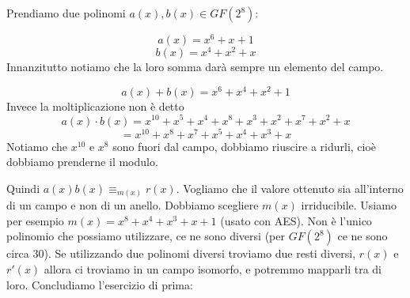 \documentclass[12pt]{report}
\begin{document}
    \begin{exmp}
        Prendiamo due polinomi $a(x),b(x) \in GF(2^8)$:

        $$a(x) = x^6 + x + 1$$
        $$b(x) = x^4 + x^2 + x$$
        Innanzitutto notiamo che la loro somma darà sempre un elemento del campo.

        $$a(x) + b(x) = x^6 + x^4 + x^2 + 1$$
        Invece la moltiplicazione non è detto
        $$a(x) \cdot b(x)  = x^10 + x^5  + x^4 + x^8 + x^3 + x^2 + x^7 + x^2 + x$$
        $$= x^10 + x^8 + x^7 + x^5 + x^4 + x^3 + x$$
        Notiamo che $x^{10}$ e $x^8$ sono fuori dal campo, dobbiamo riuscire a ridurli, cioè dobbiamo prenderne il modulo.

        \begin{center}
        \end{center}

        \noindent
        Quindi $a(x) b(x) \equiv_{m(x)} r(x)$. Vogliamo che il valore ottenuto sia all'interno di un campo e non di un anello.  Dobbiamo scegliere $m(x)$ irriducibile. Usiamo per esempio $m(x) = x^8 + x^4 + x^3 + x + 1$ (usato con AES). Non è l'unico polinomio che possiamo utilizzare, ce ne sono diversi (per $GF(2^8)$ ce ne sono circa 30). Se utilizzando due polinomi diversi troviamo due resti diversi, $r(x)$ e $r'(x)$ allora ci troviamo in un campo isomorfo, e potremmo mapparli tra di loro.
        Concludiamo l'esercizio di prima:

        \begin{center}
        \end{center}


\end{exmp}
\end{document}
